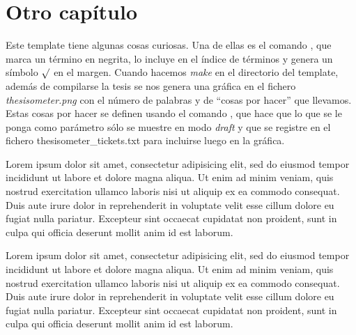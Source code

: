 \chapter{Otro capítulo}

\par
Este template tiene algunas cosas curiosas. Una de ellas es el comando , que marca un término en negrita, lo incluye en el índice de términos y genera un símbolo $\surd$ en el margen. Cuando hacemos \textit{make} en el directorio del template, además de compilarse la tesis se nos genera una gráfica en el fichero \textit{thesisometer.png} con el número de palabras y de ``cosas por hacer'' que llevamos. Estas cosas por hacer se definen usando el comando , que hace que lo que se le ponga como parámetro sólo se muestre en modo \textit{draft} y que se registre en el fichero thesisometer\_tickets.txt para incluirse luego en la gráfica. 

\par
Lorem ipsum dolor sit amet, consectetur adipisicing elit, sed do eiusmod tempor incididunt ut labore et dolore magna aliqua. Ut enim ad minim veniam, quis nostrud exercitation ullamco laboris nisi ut aliquip ex ea commodo consequat. Duis aute irure dolor in reprehenderit in voluptate velit esse cillum dolore eu fugiat nulla pariatur. Excepteur sint occaecat cupidatat non proident, sunt in culpa qui officia deserunt mollit anim id est laborum.

\par
Lorem ipsum dolor sit amet, consectetur adipisicing elit, sed do eiusmod tempor incididunt ut labore et dolore magna aliqua. Ut enim ad minim veniam, quis nostrud exercitation ullamco laboris nisi ut aliquip ex ea commodo consequat. Duis aute irure dolor in reprehenderit in voluptate velit esse cillum dolore eu fugiat nulla pariatur. Excepteur sint occaecat cupidatat non proident, sunt in culpa qui officia deserunt mollit anim id est laborum.


